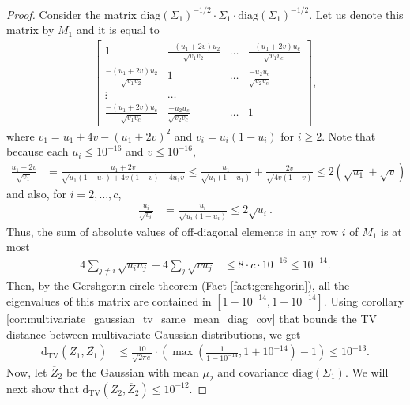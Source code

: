 \documentclass[10pt]{article} %
\theoremstyle{plain}
\newcommand{\dtv}{\mathrm{d_{TV}}}
\newcommand{\diag}{\mathrm{diag}}
\begin{document}
\begin{proof}
	Consider the matrix $\diag(\Sigma_1)^{-1/2} \cdot \Sigma_1 \cdot \diag(\Sigma_1)^{-1/2}$. Let us denote this matrix by $M_1$ and it is equal to
	\begin{align*}
		\begin{bmatrix}
			1 & \frac{-(u_1+2v)u_2}{\sqrt{v_1v_2}} & \dots &  \frac{-(u_1+2v)u_c}{\sqrt{v_1v_c}} \\
			\frac{-(u_1+2v)u_2}{\sqrt{v_1v_2}} & 1 &\dots & \frac{-u_2u_c}{\sqrt{v_2v_c}}  \\
			\vdots & \dots \\
			\frac{-(u_1+2v)u_c}{\sqrt{v_1v_c}} & \frac{-u_2u_c}{\sqrt{v_2v_c}} & \dots & 1
		\end{bmatrix},
	\end{align*}
	where $v_1 =  u_1 + 4v - (u_1 + 2v)^2$ and $v_i = u_i(1-u_i)$ for $i \ge 2$. Note that because each $u_i \le 10^{-16}$ and $v \le 10^{-16}$,
	\begin{align*}
		\frac{u_1+2v}{\sqrt{v_1}} &= \frac{u_1+2v}{\sqrt{u_1(1 - u_1) + 4v(1-v) - 4u_1v}} \le \frac{u_1}{\sqrt{u_1(1-u_1)}} + \frac{2v}{\sqrt{4v(1-v)}}  \le 2(\sqrt{u_1} + \sqrt{v})
	\end{align*}
	and also, for $i = 2,\dots,c$,
	\begin{align*}
		\frac{u_i}{\sqrt{v_i}} &= \frac{u_i}{\sqrt{u_i(1-u_i)}} \le 2\sqrt{u_i}.
	\end{align*}
	Thus, the sum of absolute values of off-diagonal elements in any row $i$ of $M_1$ is at most
	\begin{align*}
		4 \sum_{j \neq i}\sqrt{u_i u_j} + 4 \sum_{j }\sqrt{v u_j} &\le 8 \cdot c \cdot 10^{-16} \le 10^{-14}.
	\end{align*}
	Then, by the Gershgorin circle theorem (Fact \ref{fact:gershgorin}), all the eigenvalues of this matrix are contained in $[1-{10^{-14}}, 1+10^{-14}]$. Using corollary \ref{cor:multivariate_gaussian_tv_same_mean_diag_cov} that bounds the TV distance between multivariate Gaussian distributions, we get
	\begin{align*}
		\dtv(Z_1, \overline{Z_1}) &\le \frac{10}{\sqrt{2\pi e}}\cdot \left(\max\left(\frac{1}{1-10^{-14}}, 1+10^{-14}\right)-1\right) \le 10^{-13}.
	\end{align*}
	Now, let $\overline{Z}_2$ be the Gaussian with mean $\mu_2$ and covariance $\diag(\Sigma_1)$. We will next show that $\dtv(Z_2, \overline{Z}_2) \le 10^{-12}$.
	

\end{proof}
\end{document}
